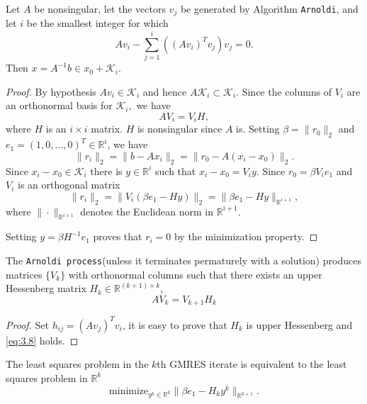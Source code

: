 \begin{lemma}
  Let $A$ be nonsingular, let the vectors $v_j$ be generated by
  Algorithm \texttt{Arnoldi}, and let $i$ be the smallest integer for
  which
  $$Av_i-\sum_{j=1}^i((Av_i)^Tv_j)v_j=0.$$
  Then $x=A^{-1}b\in x_0+\mathcal{K}_i.$
\end{lemma}

\begin{proof}
  By hypothesis $Av_i\in\mathcal{K}_i$ and hence
  $A\mathcal{K}_i\subset\mathcal{K}_i.$ Since the columns of $V_i$ are
  an orthonormal basis for $\mathcal{K}_i,$ we have $$AV_i=V_iH,$$
  where $H$ is an $i\times i$ matrix. $H$ is nonsingular since $A$
  is. Setting $\beta=\|r_0\|_2$ and
  $e_1=(1,0,\ldots,0)^T\in\mathbb{R}^i$, we have
  $$\|r_i\|_2=\|b-Ax_i\|_2=\|r_0-A(x_i-x_0)\|_2.$$
  Since $x_i-x_0\in\mathcal{K}_i$ there is $y\in\mathbb{R}^i$ such
  that $x_i-x_0=V_iy.$ Since $r_0=\beta V_ie_1$ and $V_i$ is an
  orthogonal matrix
  $$\|r_i\|_2=\|V_i(\beta e_1-Hy)\|_2=\|\beta
  e_1-Hy\|_{\mathbb{R}^{i+1}},$$
  where $\|\cdot\|_{\mathbb{R}^{i+1}}$ denotes the Euclidean norm in
  $\mathbb{R}^{i+1}.$

  Setting $y=\beta H^{-1}e_1$ proves that $r_i=0$ by the minimization
  property. 
\end{proof}

\begin{lemma}
  The \texttt{Arnoldi process}(unless it terminates permaturely with a
  solution) produces matrices $\{V_k\}$ with orthonormal columns such
  that there exists an upper Hessenberg   matrix
  $H_k\in\mathbb{R}^{(k+1)\times k}$,
  \begin{equation}
    \label{eq:3.8}
    AV_k=V_{k+1}H_k
  \end{equation}
\end{lemma}

\begin{proof}
  Set $h_{ij}=(Av_j)^Tv_i$, it is easy to prove that $H_k$ is upper
  Hessenberg and \eqref{eq:3.8} holds. 
\end{proof}

\begin{coro}
  The least squares problem in the $k$th GMRES iterate is equivalent
  to the least squares problem in $\mathbb{R}^{k}$
  \begin{equation*}
    \text{minimize}_{y^k\in\mathbb{R}^k}\|\beta e_1-H_ky^k\|_{\mathbb{R}^{k+1}}.
  \end{equation*}
\end{coro}

